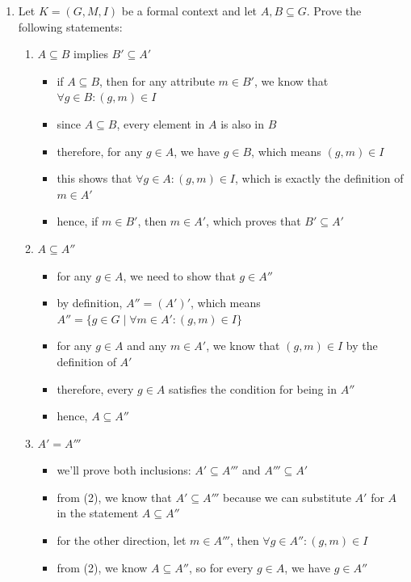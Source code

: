 \documentclass{article}
\begin{document}
\begin{enumerate}[label=\alph*)]
\begin{enumerate}[label=\alph*)]
  \item Let $K = \left(G, M, I\right)$ be a formal context and let $A, B \subseteq G$. Prove the following statements:
   \begin{enumerate}[label=\arabic*.]
     \item $A \subseteq B$ implies $B' \subseteq A'$
       \begin{itemize}
         \item if $A \subseteq B$, then for any attribute $m \in B'$, we know that $\forall g \in B: (g,m) \in I$
         \item since $A \subseteq B$, every element in $A$ is also in $B$
         \item therefore, for any $g \in A$, we have $g \in B$, which means $(g,m) \in I$
         \item this shows that $\forall g \in A: (g,m) \in I$, which is exactly the definition of $m \in A'$
         \item hence, if $m \in B'$, then $m \in A'$, which proves that $B' \subseteq A'$
       \end{itemize}
     \item $A \subseteq A''$
       \begin{itemize}
         \item for any $g \in A$, we need to show that $g \in A''$
         \item by definition, $A'' = (A')'$, which means $A'' = \{g \in G \mid \forall m \in A': (g,m) \in I\}$
         \item for any $g \in A$ and any $m \in A'$, we know that $(g,m) \in I$ by the definition of $A'$
         \item therefore, every $g \in A$ satisfies the condition for being in $A''$
         \item hence, $A \subseteq A''$
       \end{itemize}
     \item $A' = A'''$
       \begin{itemize}
         \item we'll prove both inclusions: $A' \subseteq A'''$ and $A''' \subseteq A'$
         \item from (2), we know that $A' \subseteq A'''$ because we can substitute $A'$ for $A$ in the statement $A \subseteq A''$
         \item for the other direction, let $m \in A'''$, then $\forall g \in A'': (g,m) \in I$
         \item from (2), we know $A \subseteq A''$, so for every $g \in A$, we have $g \in A''$

\end{itemize}
\end{enumerate}
\end{enumerate}
\end{enumerate}
\end{document}
